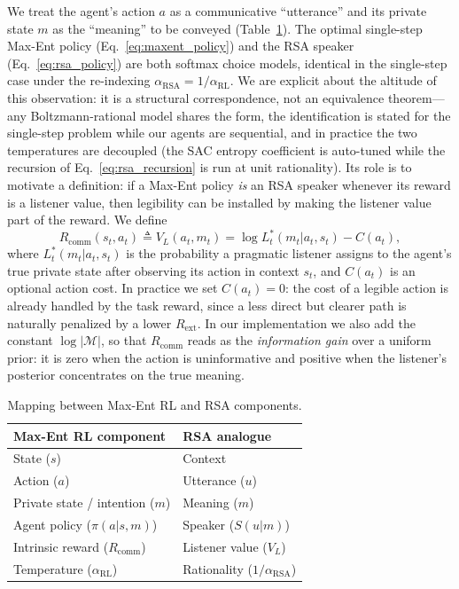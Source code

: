 \documentclass{article}
\newcommand{\Rcomm}{R_{\text{comm}}}
\newcommand{\Rext}{R_{\text{ext}}}
\newcommand{\VL}{V_L}
\newcommand{\AlphaRL}{\alpha_{\text{RL}}}
\newcommand{\AlphaRSA}{\alpha_{\text{RSA}}}
\begin{document}
We treat the agent's action $a$ as a communicative ``utterance'' and its private state $m$ as the ``meaning'' to be conveyed (Table~\ref{tab:mapping}). The optimal single-step Max-Ent policy (Eq.~\ref{eq:maxent_policy}) and the RSA speaker (Eq.~\ref{eq:rsa_policy}) are both softmax choice models, identical in the single-step case under the re-indexing $\AlphaRSA = 1/\AlphaRL$. We are explicit about the altitude of this observation: it is a structural correspondence, not an equivalence theorem---any Boltzmann-rational model shares the form, the identification is stated for the single-step problem while our agents are sequential, and in practice the two temperatures are decoupled (the SAC entropy coefficient is auto-tuned while the recursion of Eq.~\ref{eq:rsa_recursion} is run at unit rationality). Its role is to motivate a definition: if a Max-Ent policy \emph{is} an RSA speaker whenever its reward is a listener value, then legibility can be installed by making the listener value part of the reward. We define
\begin{equation}
\Rcomm(s_t, a_t) \triangleq \VL(a_t, m_t) = \log L^*_t(m_t|a_t, s_t) - C(a_t), \label{eq:comm_reward_def}
\end{equation}
where $L^*_t(m_t|a_t,s_t)$ is the probability a pragmatic listener assigns to the agent's true private state after observing its action in context $s_t$, and $C(a_t)$ is an optional action cost. In practice we set $C(a_t)=0$: the cost of a legible action is already handled by the task reward, since a less direct but clearer path is naturally penalized by a lower $\Rext$. In our implementation we also add the constant $\log|\mathcal{M}|$, so that $\Rcomm$ reads as the \emph{information gain} over a uniform prior: it is zero when the action is uninformative and positive when the listener's posterior concentrates on the true meaning.

\begin{table}[t]
\centering
\caption{Mapping between Max-Ent RL and RSA components.}
\label{tab:mapping}
\begin{tabular}{ll}
\toprule
\textbf{Max-Ent RL component} & \textbf{RSA analogue} \\
\midrule
State ($s$) & Context \\
Action ($a$) & Utterance ($u$) \\
Private state / intention ($m$) & Meaning ($m$) \\
Agent policy ($\pi(a|s,m)$) & Speaker ($S(u|m)$) \\
Intrinsic reward ($\Rcomm$) & Listener value ($\VL$) \\
Temperature ($\AlphaRL$) & Rationality ($1/\AlphaRSA$) \\
\bottomrule
\end{tabular}
\end{table}
\end{document}
